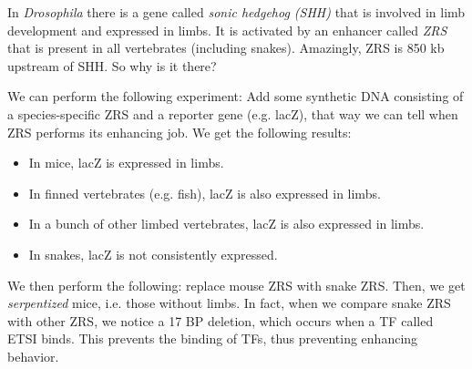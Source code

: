 \begin{exper}
	In \emph{Drosophila} there is a gene called \emph{sonic hedgehog (SHH)} that is involved in limb development and expressed in limbs. It is activated by an enhancer called \emph{ZRS} that is present in all vertebrates (including snakes).
	Amazingly, ZRS is 850 kb upstream of SHH. So why is it there?

	We can perform the following experiment: Add some synthetic DNA consisting of a species-specific ZRS and a reporter gene (e.g. lacZ), that way we can tell when ZRS performs its enhancing job.
	We get the following results:
	\begin{itemize}
		\item In mice, lacZ is expressed in limbs.
		\item In finned vertebrates (e.g. fish), lacZ is also expressed in limbs.
		\item In a bunch of other limbed vertebrates, lacZ is also expressed in limbs.
		\item In snakes, lacZ is not consistently expressed.
	\end{itemize}
	We then perform the following: replace mouse ZRS with snake ZRS. 
	Then, we get \emph{serpentized} mice, i.e. those without limbs.
	In fact, when we compare snake ZRS with other ZRS, we notice a 17 BP deletion, which occurs when a TF called ETSI binds.
	This prevents the binding of TFs, thus preventing enhancing behavior.
\end{exper}
